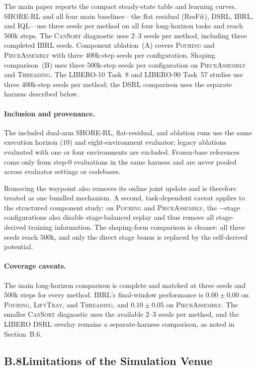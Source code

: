 \documentclass[letterpaper]{article} %
\begin{document}
The main paper reports the compact steady-state table and learning curves.
SHORE-RL and all four main baselines---the flat residual (ResFit), DSRL, IBRL,
and IQL---use three seeds per method on all four long-horizon tasks and reach
$500$k steps. The
\textsc{CanSort} diagnostic uses $2$--$3$ seeds per method, including three
completed IBRL seeds. Component
ablation~(A) covers \textsc{Pouring} and \textsc{PieceAssembly} with three
$400$k-step seeds per configuration. Shaping comparison~(B) uses three
$500$k-step seeds per configuration on
\textsc{PieceAssembly} and \textsc{Threading}. The LIBERO-10 Task~8 and
LIBERO-90 Task~57 studies use three $400$k-step seeds per method; the DSRL
comparison uses the separate harness described below.

\paragraph{Inclusion and provenance.}
The included dual-arm SHORE-RL, flat-residual, and ablation runs use the same
execution horizon ($10$) and eight-environment evaluator; legacy ablations evaluated
with one or four environments are excluded. Frozen-base references come only from
step-$0$ evaluations in the same harness and are never pooled across evaluator
settings or codebases.

Removing the waypoint also removes its online joint update and is therefore treated
as one bundled mechanism. A second, task-dependent caveat applies to the
structured component study: on \textsc{Pouring} and \textsc{PieceAssembly}, the
$-$stage configurations also disable stage-balanced replay and thus remove all stage-derived
training information. The shaping-form comparison is cleaner: all three seeds reach $500$k,
and only the direct stage bonus is replaced by the self-derived potential.

\paragraph{Coverage caveats.}
The main long-horizon comparison is complete and matched at three seeds and
$500$k steps for every method. IBRL's final-window performance is $0.00{\pm}0.00$ on
\textsc{Pouring}, \textsc{LiftTray}, and \textsc{Threading}, and
$0.10{\pm}0.05$ on \textsc{PieceAssembly}. The
smaller \textsc{CanSort} diagnostic uses the available $2$--$3$ seeds per
method, and the LIBERO DSRL overlay remains a separate-harness comparison, as
noted in Section~B.6.

\subsection{B.8\quad Limitations of the Simulation Venue}
\end{document}
